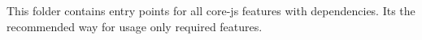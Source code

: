 This folder contains entry points for all {\ttfamily core-\/js} features with dependencies. It\textquotesingle{}s the recommended way for usage only required features. 